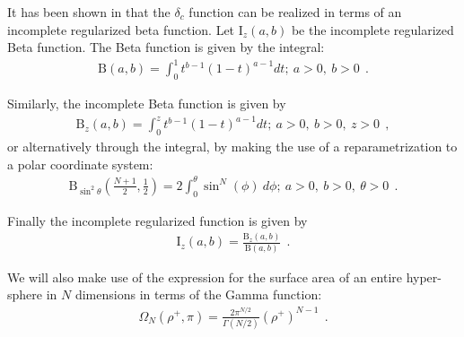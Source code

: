 It has been shown in \cite{Li2011} that the $\delta_c$ function can be realized in terms of an incomplete regularized beta function. Let $\text{I}_z(a,b)$ be the incomplete regularized Beta function. The Beta function is given by the integral:
\begin{equation}\label{eq:beta}
    \begin{aligned}
        \text{B}(a,b) = \int_0^1 t^{b-1}(1-t)^{a-1}dt; \ a>0,\ b>0  \ \ .
    \end{aligned}
\end{equation}

Similarly, the incomplete Beta function is given by
\begin{equation}\label{eq:beta_inc}
    \begin{aligned}
        \text{B}_z(a,b) = \int_0^z t^{b-1}(1-t)^{a-1}dt; \ a>0,\ b>0,\ z>0 \ \ ,
    \end{aligned}
\end{equation}
or alternatively through the integral, by making the use of a reparametrization to a polar coordinate system:
\begin{equation}\label{eq:beta_inc_sin}
    \begin{aligned}
        \text{B}_{\sin^2\theta}(\frac{N+1}{2},\frac{1}{2}) = 2\int_0^\theta \sin^N (\phi)\ d\phi; \ a>0,\ b>0,\ \theta>0 \ \ .
    \end{aligned}
\end{equation}

Finally the incomplete regularized function is given by
\begin{equation}\label{eq:beta_inc_reg}
    \begin{aligned}
        \text{I}_z(a,b) = \frac{\text{B}_z(a,b)}{\text{B}(a,b)} \ \ .
    \end{aligned}
\end{equation}

We will also make use of the expression for the surface area of an entire hyper-sphere in $N$ dimensions in terms of the Gamma function:
\begin{equation}\label{eq:omega_gamma}
    \begin{aligned}
        \Omega_N(\rho^+,\pi) = \frac{2\pi^{N/2}}{\Gamma(N/2)}(\rho^+)^{N-1} \ \ .
    \end{aligned}
\end{equation}

